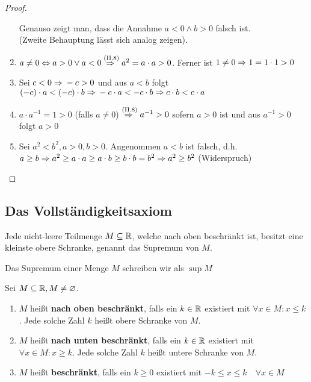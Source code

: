 \begin{satz}
\begin{proof}
\begin{enumerate}[label=(II.\arabic*)]
            Genauso zeigt man, dass die Annahme $a<0 \land b > 0$ falsch ist.\\
            (Zweite Behauptung lässt sich analog zeigen).
            \item $a\neq 0 \Leftrightarrow{} a > 0 \lor a < 0 \overset{\text{(II.8)}}{\Rightarrow{}} a^2 = a \cdot a > 0$. Ferner ist $1\neq 0 \Rightarrow{} 1=1\cdot 1 > 0$
            \item Sei $c<0 \Rightarrow{} -c > 0$ und aus $a<b$ folgt $(-c)\cdot a < (-c)\cdot b \Rightarrow{} -c\cdot a < -c\cdot b \Rightarrow{} c\cdot b < c\cdot a$
            \item $a\cdot a^{-1} = 1 > 0$ (falls $a\neq 0$) $\overset{\text{(II.8)}}{\Rightarrow{}} a^{-1} > 0$ sofern $a>0$ ist und aus $a^{-1}>0$ folgt $a>0$
            \item Sei $a^{2}<b^2, a>0, b>0$. Angenommen $a<b$ ist falsch, d.h. $a\geq b \Rightarrow{} a^{2} \geq a \cdot a \geq a\cdot b\geq b\cdot b = b^{2}\Rightarrow{} a^{2}\geq b^{2}$ (Widerspruch)
        \end{enumerate}
    \end{proof}
\end{satz}

\newpage

\subsection{Das Vollständigkeitsaxiom}

\begin{axiom}[Vollständigkeitsaxiom]
    Jede nicht-leere Teilmenge $M\subseteq \mathbb{R}$, welche nach oben beschränkt ist, besitzt eine kleinste obere Schranke, genannt das Supremum von $M$.
\end{axiom}

\begin{notation}[Supremum]
    Das Supremum einer Menge $M$ schreiben wir als $\sup M$
\end{notation}

\begin{definition}
    Sei $M\subseteq \mathbb{R}, M\neq \varnothing$.
    \begin{enumerate}[label=(\roman*)]
        \item $M$ heißt \textbf{nach oben beschränkt}, falls ein $k\in\mathbb{R}$ existiert mit $\forall x\in M:x\leq k$.
        Jede solche Zahl $k$ heißt obere Schranke von $M$.
        \item $M$ heißt \textbf{nach unten beschränkt}, falls ein $k\in\mathbb{R}$ existiert mit $\forall x\in M:x\geq k$.
        Jede solche Zahl $k$ heißt untere Schranke von $M$.
        \item $M$ heißt \textbf{beschränkt}, falls ein $k\geq 0$ existiert mit $-k\leq x \leq k\quad \forall x\in M$
    \end{enumerate}
\end{definition}

